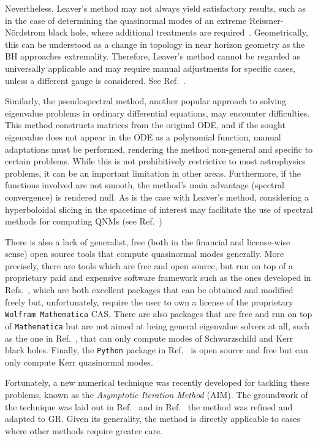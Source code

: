 Nevertheless, Leaver's method may not always yield satisfactory results, such as in the case of determining the quasinormal modes of an extreme Reissner-N\"ordstrom black hole, where additional treatments are required~\cite{PhysRevD.93.064062}. Geometrically, this can be understood as a change in topology in near horizon geometry as the \ac{BH} approaches extremality. Therefore, Leaver's method cannot be regarded as universally applicable and may require manual adjustments for specific cases, unless a different gauge is considered. See Ref.~\cite{PhysRevD.98.124005}.

Similarly, the pseudospectral method, another popular approach to solving eigenvalue problems in ordinary differential equations, may encounter difficulties. This method constructs matrices from the original \ac{ODE}, and if the sought eigenvalue does not appear in the \ac{ODE} as a polynomial function, manual adaptations must be performed, rendering the method non-general and specific to certain problems. While this is not prohibitively restrictive to most astrophysics problems, it can be an important limitation in other areas. Furthermore, if the functions involved are not smooth, the method's main advantage (spectral convergence) is rendered null. As is the case with Leaver's method, considering a hyperboloidal slicing in the spacetime of interest may facilitate the use of spectral methods for computing \ac{QNM}s (see Ref.~\cite{PhysRevX.11.031003})

There is also a lack of generalist, free (both in the financial and license-wise sense) open source tools that compute quasinormal modes generally. More precisely, there are tools which are free and open source, but run on top of a proprietary paid and expensive software framework such as the ones developed in Refs.~\cite{qnmspectral,spectralbp}, which are both excellent packages that can be obtained and modified freely but, unfortunately, require the user to own a license of the proprietary \texttt{Wolfram Mathematica} \ac{CAS}. There are also packages that are free and run on top of \texttt{Mathematica} but are not aimed at being general eigenvalue solvers at all, such as the one in Ref.~\cite{bhpt_quasinormalmodes}, that can only compute modes of Schwarzschild and Kerr black holes. Finally, the \texttt{Python} package in Ref.~\cite{bhpt_qnm} is open source and free but can only compute Kerr quasinormal modes.

Fortunately, a new numerical technique was recently developed for tackling these problems, known as the \emph{Asymptotic Iteration Method} (\ac{AIM}). The groundwork of the technique was laid out in Ref.~\cite{aim_original} and in Ref.~\cite{aim_improved} the method was refined and adapted to \ac{GR}. Given its generality, the method is directly applicable to cases where other methods require greater care.

